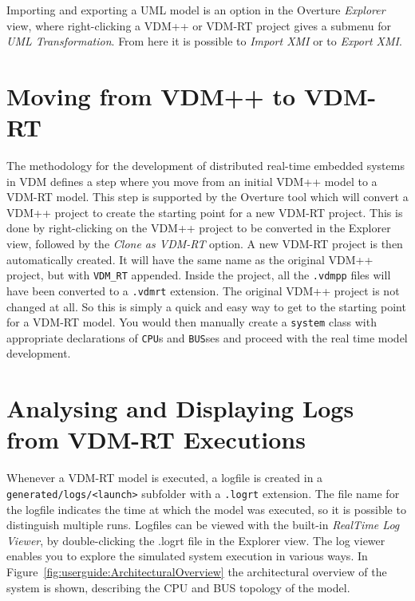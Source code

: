 \documentclass{overturerepchap}
\begin{document}
Importing and exporting a UML model is
an option in the Overture \emph{Explorer} view, where right-clicking
a VDM++ or VDM-RT project gives a submenu for
\emph{UML Transformation}. From here
it is possible to \emph{Import XMI} or to
\emph{Export XMI}.

\chapter{Moving from VDM++ to VDM-RT}\label{sec:ToVDMRT}

The methodology for the development of distributed real-time
embedded systems in VDM defines a step where you
move from an initial VDM++ model to a VDM-RT model\cite{Larsen&09b}. This
step is supported by the Overture tool which will convert
a VDM++ project to create the starting point for a new VDM-RT
project. This is done by right-clicking on the VDM++ project to be
converted in the Explorer view, followed by 
the \emph{Clone as VDM-RT} option. A new VDM-RT project is then automatically
created. It will have the
same name as the original VDM++ project, but with \texttt{VDM\_RT} appended.
Inside the project, all the \texttt{.vdmpp} files will have been converted
to a \texttt{.vdmrt} extension. The original VDM++ project is not
changed at all. So this is simply a quick and easy way to get to the
starting point for a VDM-RT model. You would then manually create
a \texttt{system} class with appropriate declarations of
\texttt{CPU}s and \texttt{BUS}ses and proceed with the real time
model development.
 
\chapter{Analysing and Displaying Logs from VDM-RT Executions}\label{sec:showlog}

Whenever a VDM-RT model is executed, a logfile is created in
a \texttt{generated/logs/<launch>} subfolder with a \texttt{.logrt} extension. The
file name for the logfile indicates the time at which the model was executed,
so it is possible to distinguish multiple runs. Logfiles can be
viewed with the built-in \emph{RealTime Log Viewer},
by double-clicking the .logrt file in the Explorer view. The log viewer enables
you to explore the simulated system execution in various ways. In
Figure~\ref{fig:userguide:ArchitecturalOverview} the architectural
overview of the system is shown, describing the CPU and BUS topology of
the model.
\end{document}
